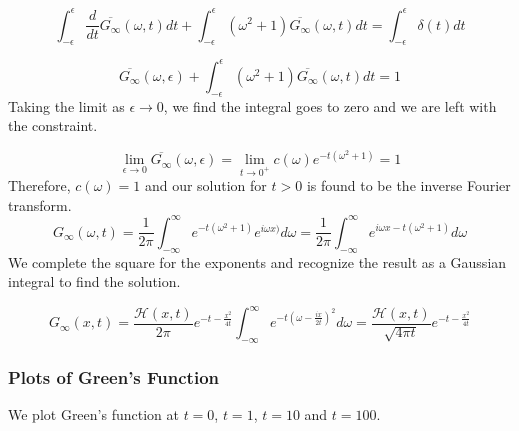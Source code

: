 \documentclass[12pt]{article}
\begin{document}
$$\int_{-\epsilon}^{\epsilon}\frac{d}{dt}\overline{G_{\infty}}(\omega,t)dt + \int_{-\epsilon}^{\epsilon}(\omega^2+1)\overline{G_{\infty}}(\omega,t)dt = \int_{-\epsilon}^{\epsilon}\delta(t)dt $$

$$  \overline{G_{\infty}}(\omega,\epsilon) + \int_{-\epsilon}^{\epsilon}(\omega^2+1)\overline{G_{\infty}}(\omega,t)dt = 1$$
Taking the limit as $\epsilon \to 0$, we find the integral goes to zero and we are left with the constraint.

$$ \lim_{\epsilon\to 0} \overline{G_{\infty}}(\omega,\epsilon)  = \lim_{t\to 0^+}c(\omega)e^{-t(\omega^2+1)}  = 1 $$
Therefore, $c(\omega) = 1$ and our solution for $t>0$ is found to be the inverse Fourier transform.
$$G_{\infty}(\omega,t) = \frac{1}{2\pi}\int_{-\infty}^{\infty}e^{-t(\omega^2+1)}e^{i \omega x)} d\omega = \frac{1}{2\pi}\int_{-\infty}^{\infty}e^{i \omega x-t(\omega^2+1)}d\omega $$
We complete the square for the exponents and recognize the result as a Gaussian integral to find the solution.

$$ G_{\infty}(x,t) = \frac{\mathcal{H}(x,t)}{2\pi}e^{-t-\frac{x^2}{4t}}\int_{-\infty}^{\infty}e^{-t(\omega - \frac{ix}{2t} )^2 }d\omega = \frac{\mathcal{H}(x,t)}{\sqrt{4\pi t}}e^{-t-\frac{x^2}{4t}} $$

\subsubsection{Plots of Green's Function}
We plot Green's function at $t=0$, $t=1$, $t=10$ and $t=100$.
\end{document}
